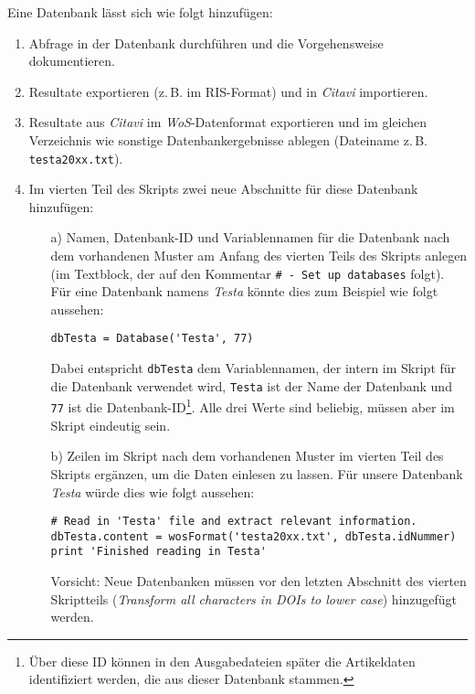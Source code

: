 Eine Datenbank lässt sich wie folgt hinzufügen:
\begin{enumerate}
\item Abfrage in der Datenbank durchführen und die Vorgehensweise dokumentieren.
\item Resultate exportieren (z.\,B. im RIS-Format) und in \textit{Citavi} importieren.
\item Resultate aus \textit{Citavi} im \textit{WoS}-Datenformat exportieren und im gleichen Verzeichnis wie sonstige Datenbankergebnisse ablegen (Dateiname z.\,B. \texttt{testa20xx.txt}).
\item Im vierten Teil des Skripts zwei neue Abschnitte für diese Datenbank hinzufügen:
\begin{itemize}
\item[a)] Namen, Datenbank-ID und Variablennamen für die Datenbank nach dem vorhandenen Muster am Anfang des vierten Teils des Skripts anlegen (im Textblock, der auf den Kommentar \texttt{\# - Set up databases} folgt). Für eine Datenbank namens \textit{Testa} könnte dies zum Beispiel wie folgt aussehen: 
\begin{verbatim}
dbTesta = Database('Testa', 77)
\end{verbatim}
Dabei entspricht \texttt{dbTesta} dem Variablennamen, der intern im Skript für die Datenbank verwendet wird, \texttt{Testa} ist der Name der Datenbank und \texttt{77} ist die Datenbank-ID\footnote{Über diese ID können in den Ausgabedateien später die Artikeldaten identifiziert werden, die aus dieser Datenbank stammen.}. Alle drei Werte sind beliebig, müssen aber im Skript eindeutig sein.
\item[b)] Zeilen im Skript nach dem vorhandenen Muster im vierten Teil des Skripts ergänzen, um die Daten einlesen zu lassen. Für unsere Datenbank \textit{Testa} würde dies wie folgt aussehen:
\begin{verbatim}
# Read in 'Testa' file and extract relevant information.
dbTesta.content = wosFormat('testa20xx.txt', dbTesta.idNummer)
print 'Finished reading in Testa'
\end{verbatim}
Vorsicht: Neue Datenbanken müssen vor den letzten Abschnitt des vierten Skriptteils (\textit{Transform all characters in DOIs to lower case}) hinzugefügt werden.
\end{itemize}
\end{enumerate}

